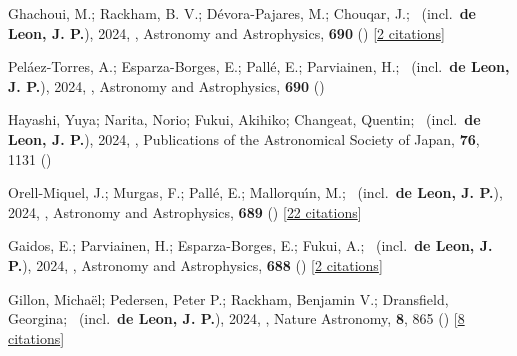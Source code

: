 \item[{\color{numcolor}\scriptsize74}] Ghachoui, M.; Rackham, B. V.; D{\'e}vora-Pajares, M.; Chouqar, J.; \etal\ (incl.\ \textbf{de Leon, J. P.}), 2024, , Astronomy and Astrophysics, \textbf{690} () [\href{https://ui.adsabs.harvard.edu/abs/2024A&A...690A.263G}{2 citations}]

\item[{\color{numcolor}\scriptsize73}] Pel{\'a}ez-Torres, A.; Esparza-Borges, E.; Pall{\'e}, E.; Parviainen, H.; \etal\ (incl.\ \textbf{de Leon, J. P.}), 2024, , Astronomy and Astrophysics, \textbf{690} ()

\item[{\color{numcolor}\scriptsize72}] Hayashi, Yuya; Narita, Norio; Fukui, Akihiko; Changeat, Quentin; \etal\ (incl.\ \textbf{de Leon, J. P.}), 2024, , Publications of the Astronomical Society of Japan, \textbf{76}, 1131 ()

\item[{\color{numcolor}\scriptsize71}] Orell-Miquel, J.; Murgas, F.; Pall{\'e}, E.; Mallorqu{\'\i}n, M.; \etal\ (incl.\ \textbf{de Leon, J. P.}), 2024, , Astronomy and Astrophysics, \textbf{689} () [\href{https://ui.adsabs.harvard.edu/abs/2024A&A...689A.179O}{22 citations}]

\item[{\color{numcolor}\scriptsize70}] Gaidos, E.; Parviainen, H.; Esparza-Borges, E.; Fukui, A.; \etal\ (incl.\ \textbf{de Leon, J. P.}), 2024, , Astronomy and Astrophysics, \textbf{688} () [\href{https://ui.adsabs.harvard.edu/abs/2024A&A...688L..34G}{2 citations}]

\item[{\color{numcolor}\scriptsize69}] Gillon, Micha{\"e}l; Pedersen, Peter P.; Rackham, Benjamin V.; Dransfield, Georgina; \etal\ (incl.\ \textbf{de Leon, J. P.}), 2024, , Nature Astronomy, \textbf{8}, 865 () [\href{https://ui.adsabs.harvard.edu/abs/2024NatAs...8..865G}{8 citations}]


